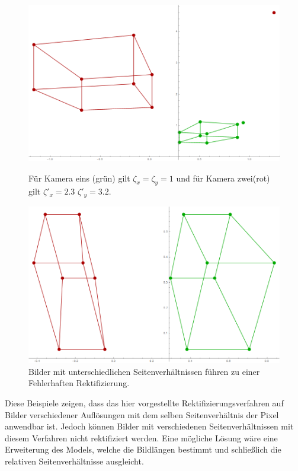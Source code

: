 \begin{figure}[!htb]
	\includegraphics[width=\linewidth]{images/Rectification_Resolution_Abbild_verhaeltnisse.png}
	\caption[Rektifizierung mit $\zeta'_x = 2.3$ und $\zeta'_y = 3.2$]{Für Kamera eins (grün) gilt \ensuremath{\zeta_x = \zeta_y = 1} und für Kamera zwei(rot) gilt \ensuremath{\zeta'_x = 2.3} $\zeta'_y= 3.2$.}
	\label{fig:7.18}
	\endminipage\hfill
	\includegraphics[width=\linewidth]{images/Rectification_Resolution_verhaeltnisse.png}
	\caption[Rektifizierung mit $\zeta'_x = 2.3$ und $\zeta'_y = 3.2$]{Bilder mit unterschiedlichen Seitenverhältnissen führen zu einer Fehlerhaften Rektifizierung.}
	\label{fig:7.19}
	\endminipage\hfill
\end{figure}


Diese Beispiele zeigen, dass das hier vorgestellte Rektifizierungsverfahren auf Bilder verschiedener Auflösungen mit dem selben Seitenverhältnis der Pixel anwendbar ist. Jedoch können Bilder mit verschiedenen Seitenverhältnissen mit diesem Verfahren nicht rektifiziert werden. Eine mögliche Lösung wäre eine Erweiterung des Models, welche die Bildlängen bestimmt und schließlich die relativen Seitenverhältnisse ausgleicht.  


